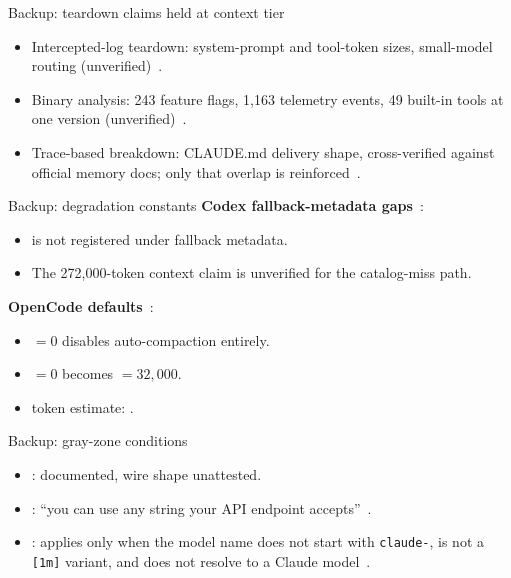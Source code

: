 \documentclass[aspectratio=169,11pt]{beamer}
\begin{document}
\begin{frame}{Backup: teardown claims held at context tier}
  \begin{itemize}
    \item Intercepted-log teardown: system-prompt and tool-token sizes,
      small-model routing (unverified)~\citep{minusXClaudeCodeTeardown}.
    \item Binary analysis: 243 feature flags, 1{,}163 telemetry events,
      49 built-in tools at one version (unverified)~\citep{tenguDecoded}.
    \item Trace-based breakdown: CLAUDE.md delivery shape, cross-verified
      against official memory docs; only that overlap is reinforced~\citep{agiflowClaudeCodeInternals,claudeCodeDocsMemory}.
  \end{itemize}
\end{frame}

\begin{frame}{Backup: degradation constants}
  \textbf{Codex fallback-metadata gaps}~\citep{codexRepo}:
  \begin{itemize}
    \item {} is not registered under fallback metadata.
    \item The 272{,}000-token context claim is unverified for the
    catalog-miss path.
  \end{itemize}
  \textbf{OpenCode defaults}~\citep{opencodeRepo}:
  \begin{itemize}
    \item {} $=0$ disables auto-compaction entirely.
    \item {} $=0$ becomes $=32{,}000$.
    \item token estimate: .
  \end{itemize}
\end{frame}

\begin{frame}{Backup: gray-zone conditions}
  \begin{itemize}
    \item {}: documented, wire shape unattested.
    \item {}: ``you can use any string
    your API endpoint accepts''~\citep{claudeCodeModelDocs}.
    \item {}: applies only when the
    model name does not start with \texttt{claude-}, is not a
    \texttt{[1m]} variant, and does not resolve to a Claude
    model~\citep{claudeCodeModelDocs}.
  \end{itemize}
\end{frame}
\end{document}
